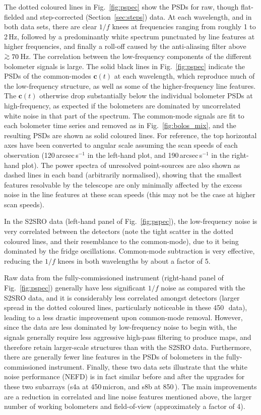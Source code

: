 \documentclass[useAMS,usenatbib,nofootinbib]{mn2e}
\def\gsim{\mathrel{\lower2.5pt\vbox{\lineskip=0pt\baselineskip=0pt
          \hbox{$>$}\hbox{$\sim$}}}}
\begin{document}
The dotted coloured lines in Fig.~\ref{fig:pspec} show the PSDs for
raw, though flat-fielded and step-corrected (Section~\ref{sec:steps})
data. At each wavelength, and in both data sets, there are clear $1/f$
knees at frequencies ranging from roughly 1 to 2\,Hz, followed by a
predominantly white spectrum punctuated by line features at higher
frequencies, and finally a roll-off caused by the anti-aliasing filter
above $\gsim 70$\,Hz. The correlation between the low-frequency
components of the different bolometer signals is large. The solid
black lines in Fig.~\ref{fig:pspec} indicate the PSDs of the
common-modes $\mathbf{c}(t)$ at each wavelength, which reproduce much
of the low-frequency structure, as well as some of the
higher-frequency line features. The $\mathbf{c}(t)$ otherwise drop
substantially below the individual bolometer PSDs at high-frequency,
as expected if the bolometers are dominated by uncorrelated white
noise in that part of the spectrum. The common-mode signals are fit to
each bolometer time series and removed as in Fig.~\ref{fig:bolos_mix},
and the resulting PSDs are shown as solid coloured lines.  For
reference, the top horizontal axes have been converted to angular
scale assuming the scan speeds of each observation
(120\,arcsec\,s$^{-1}$ in the left-hand plot, and
190\,arcsec\,s$^{-1}$ in the right-hand plot). The power spectra of
unresolved point-sources are also shown as dashed lines in each band
(arbitrarily normalised), showing that the smallest features
resolvable by the telescope are only minimally affected by the excess
noise in the line features at these scan speeds (this may not be the
case at higher scan speeds).

In the S2SRO data (left-hand panel of Fig.~\ref{fig:pspec}), the
low-frequency noise is very correlated between the detectors (note the
tight scatter in the dotted coloured lines, and their resemblance to the
common-mode), due to it being dominated by the fridge
oscillations. Common-mode subtraction is very effective, reducing the
$1/f$ knees in both wavelengths by about a factor of 5.

Raw data from the fully-commissioned instrument (right-hand panel of
Fig.~\ref{fig:pspec}) generally have less significant $1/f$ noise as
compared with the S2SRO data, and it is considerably less correlated
amongst detectors (larger spread in the dotted coloured lines,
particularly noticeable in these 450\,\micron\ data), leading to a
less drastic improvement upon common-mode removal. However, since the
data are less dominated by low-frequency noise to begin with, the
signals generally require less aggressive high-pass filtering to
produce maps, and therefore retain larger-scale structures than with
the S2SRO data. Furthermore, there are generally fewer line features
in the PSDs of bolometers in the fully-commissioned
instrument. Finally, these two data sets illustrate that the white
noise performance (NEFD) is in fact similar before and after the
upgrades for these two subarrays (s4a at 450\,micron, and s8b at
850\,\micron). The main improvements are a reduction in correlated and
line noise features mentioned above, the larger number of working
bolometers and field-of-view (approximately a factor of 4).
\end{document}
